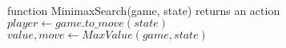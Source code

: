\documentclass[preview]{standalone}
\begin{document}
\begin{center}
\quad\\function MinimaxSearch(game, state) returns an action\quad\\$player \gets game.to\_move(state)$\quad\\$value, move \gets MaxValue(game, state)$
\end{center}
\end{document}
